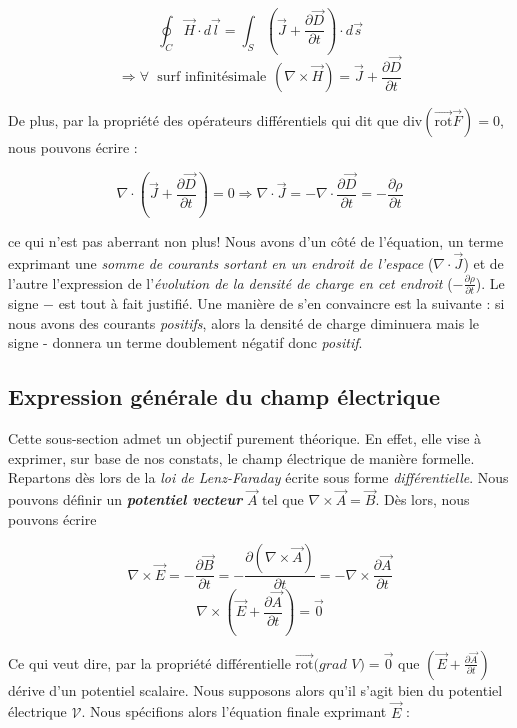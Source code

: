 \[ \oint_{C} \vec{H} \cdot d\vec{l} = \int_{S} (\vec{J} +\frac{\partial \vec{D}}{\partial t}) \cdot d\vec{s} \]
\[ \Rightarrow \forall  \hspace{3pt} \mbox{ surf infinitésimale} \hspace{5pt} (\nabla \times \vec{H} ) = \vec{J} + \frac{\partial \vec{D}}{\partial t}\]

De plus, par la propriété des opérateurs différentiels qui dit que $\text{div}(\vec{\text{rot}}\vec{F}) = 0$, nous pouvons écrire : 

\[ \nabla \cdot (\vec{J} + \frac{\partial \vec{D}}{\partial t}) = 0 \Rightarrow \nabla \cdot \vec{J} = - \nabla \cdot \frac{\partial \vec{D}}{\partial t} = - \frac{\partial \rho}{\partial t}\]

ce qui n'est pas aberrant non plus! Nous avons d'un côté de l'équation, un terme exprimant une \textit{somme de courants sortant en un endroit de l'espace} ($\nabla \cdot \vec{J}$) et de l'autre l'expression de l'\textit{évolution de la densité de charge en cet endroit} ($- \frac{\partial \rho}{\partial t}$). Le signe $-$ est tout à fait justifié. Une manière de s'en convaincre est la suivante : si nous avons des courants \textit{positifs}, alors la densité de charge diminuera mais le signe - donnera un terme doublement négatif donc \textit{positif}.

\subsection{Expression générale du champ électrique}

Cette sous-section admet un objectif purement théorique. En effet, elle vise à exprimer, sur base de nos constats, le champ électrique de manière formelle. 
Repartons dès lors de la \textit{loi de Lenz-Faraday} écrite sous forme \textit{différentielle}.
Nous pouvons définir un \textit{\textbf{potentiel vecteur}} $\vec{A}$ tel que $\nabla \times \vec{A} = \vec{B}$.  Dès lors, nous pouvons écrire 

\[\nabla \times \vec{E} = - \frac{\partial \vec{B}}{\partial t} = -\frac{\partial (\nabla \times \vec{A})}{\partial t} = - \nabla \times \frac{\partial \vec{A}}{\partial t} \]
\[\nabla \times (\vec{E} + \frac{\partial \vec{A}}{\partial t}) = \vec{0} \]

Ce qui veut dire, par la propriété différentielle $\vec{\text{rot}}(grad$ $V) = \vec{0}$ que $(\vec{E} + \frac{\partial \vec{A}}{\partial t})$ dérive d'un potentiel scalaire.
Nous supposons alors qu'il s'agit bien du potentiel électrique $\mathcal{V}$. Nous spécifions alors l'équation finale exprimant $\vec{E}$ : 

